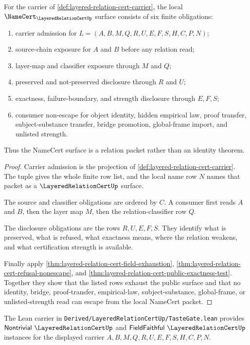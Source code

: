 \begin{theorem}
\label{thm:layered-relation-cert-namecert-obligation-surface}
For the carrier of \autoref{def:layered-relation-cert-carrier}, the local $\NameCert_{\LayeredRelationCertUp}$ surface consists of six finite obligations:
\begin{enumerate}
\item carrier admission for $L=(A,B,M,Q,R,U,E,F,S,H,C,P,N)$;
\item source-chain exposure for $A$ and $B$ before any relation read;
\item layer-map and classifier exposure through $M$ and $Q$;
\item preserved and not-preserved disclosure through $R$ and $U$;
\item exactness, failure-boundary, and strength disclosure through $E,F,S$;
\item consumer non-escape for object identity, hidden empirical law, proof transfer, subject-substance transfer, bridge promotion, global-frame import, and unlisted strength.
\end{enumerate}
Thus the NameCert surface is a relation packet rather than an identity theorem.
\end{theorem}
\begin{proof}
Carrier admission is the projection of \autoref{def:layered-relation-cert-carrier}. The tuple gives the whole finite row list, and the local name row $N$ names that packet as a $\LayeredRelationCertUp$ surface.

The source and classifier obligations are ordered by $C$. A consumer first reads $A$ and $B$, then the layer map $M$, then the relation-classifier row $Q$.

The disclosure obligations are the rows $R,U,E,F,S$. They identify what is preserved, what is refused, what exactness means, where the relation weakens, and what certification strength is available.

Finally apply \autoref{thm:layered-relation-cert-field-exhaustion}, \autoref{thm:layered-relation-cert-refusal-nonescape}, and \autoref{thm:layered-relation-cert-public-exactness-test}. Together they show that the listed rows exhaust the public surface and that no identity, bridge, proof-transfer, empirical-law, subject-substance, global-frame, or unlisted-strength read can escape from the local NameCert packet.
\end{proof}

The Lean carrier in \texttt{Derived/LayeredRelationCertUp/TasteGate.lean} provides $\mathsf{Nontrivial}\ \LayeredRelationCertUp$ and $\mathsf{FieldFaithful}\ \LayeredRelationCertUp$ instances for the displayed carrier $A,B,M,Q,R,U,E,F,S,H,C,P,N$.


